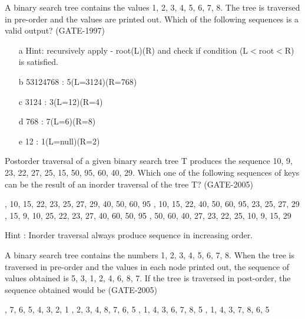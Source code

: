 \begin{questyle}
  \question  A binary search tree contains the values 1, 2, 3, 4, 5, 6, 7, 8. The tree is traversed
            in pre-order and the values are printed out. Which of the following sequences is a valid output?  (GATE-1997)
  \begin{choices}
      
  \end{choices}

  \begin{enumerate}
        \item[a] Hint: recursively apply - root(L)(R) and check if condition (L\(<\)root\(<\)R) is satisfied.
        \item[b] 53124768 : 5(L=3124)(R=768)
        \item[c] 3124 : 3(L=12)(R=4)
        \item[d] 768 : 7(L=6)(R=8)
        \item[e] 12 : 1(L=null)(R=2)
  \end{enumerate}
\end{questyle}


\begin{questyle}
  \question  Postorder traversal of a given binary search tree T produces the sequence
             10, 9, 23, 22, 27, 25, 15, 50, 95, 60, 40, 29. Which one of the following sequences
             of keys can be the result of an inorder traversal of the tree T? (GATE-2005)
  \begin{choices}
    , 10, 15, 22, 23, 25, 27, 29, 40, 50, 60, 95
    , 10, 15, 22, 40, 50, 60, 95, 23, 25, 27, 29
    , 15, 9, 10, 25, 22, 23, 27, 40, 60, 50, 95
    , 50, 60, 40, 27, 23, 22, 25, 10, 9, 15, 29
  \end{choices}
  Hint : Inorder traversal always produce sequence in increasing order.
\end{questyle}

\begin{questyle}
  \question  A binary search tree contains the numbers 1, 2, 3, 4, 5, 6, 7, 8. When the tree is
            traversed in pre-order and the values in each node printed out, the sequence of values
            obtained is 5, 3, 1, 2, 4, 6, 8, 7. If the tree is traversed in post-order, the sequence
            obtained would be  (GATE-2005)

  \begin{choices}
    , 7, 6, 5, 4, 3, 2, 1
    , 2, 3, 4, 8, 7, 6, 5
    , 1, 4, 3, 6, 7, 8, 5
    , 1, 4, 3, 7, 8, 6, 5
  \end{choices}
\end{questyle}


